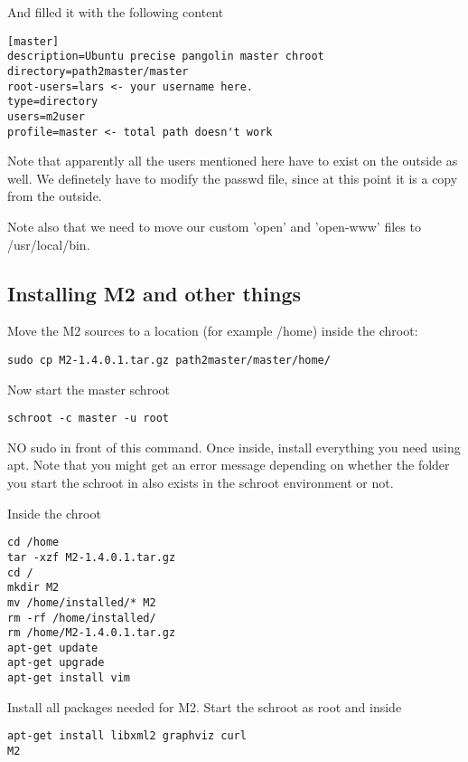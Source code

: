 \documentclass[a4paper]{book}
\begin{document}
And filled it with the following content

\begin{verbatim}
[master]
description=Ubuntu precise pangolin master chroot
directory=path2master/master
root-users=lars <- your username here.
type=directory
users=m2user
profile=master <- total path doesn't work
\end{verbatim}

Note that apparently all the users mentioned here have to exist on the outside
as well.  We definetely have to modify the passwd file, since at this point it
is a copy from the outside.

Note also that we need to move our custom 'open' and 'open-www' files to /usr/local/bin.

\subsection{Installing M2 and other things}

Move the M2 sources to a location (for example /home) inside the chroot:

\begin{verbatim}
sudo cp M2-1.4.0.1.tar.gz path2master/master/home/
\end{verbatim}

Now start the master schroot

\begin{verbatim}
schroot -c master -u root
\end{verbatim}

NO sudo in front of this command. Once inside, install everything you need
using apt.  Note that you might get an error message depending on whether the
folder you start the schroot in also exists in the schroot environment or not.

Inside the chroot

\begin{verbatim}
cd /home
tar -xzf M2-1.4.0.1.tar.gz
cd /
mkdir M2
mv /home/installed/* M2
rm -rf /home/installed/
rm /home/M2-1.4.0.1.tar.gz
apt-get update
apt-get upgrade
apt-get install vim
\end{verbatim}

Install all packages needed for M2. Start the schroot as root and inside

\begin{verbatim}
apt-get install libxml2 graphviz curl
M2
\end{verbatim}
\end{document}
